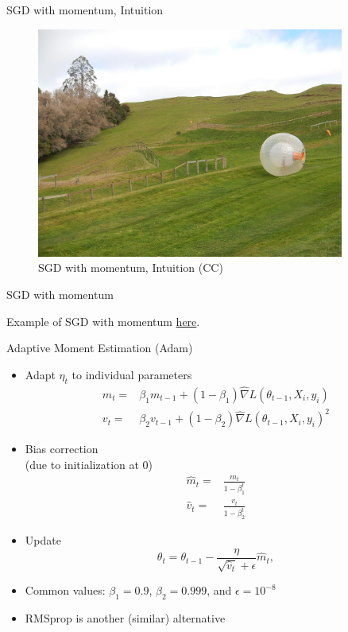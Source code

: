 \documentclass[10pt]{beamer}
\begin{document}
\begin{frame}{SGD with momentum, Intuition}

\begin{figure}[h]
\caption{SGD with momentum, Intuition (CC)}
\centering
\includegraphics[width=0.9\textwidth]{figs/zorb}
\end{figure}

\end{frame}

\begin{frame}{SGD with momentum}

Example of SGD with momentum \href{https://distill.pub/2017/momentum/}{here}.

\end{frame}


\begin{frame}{Adaptive Moment Estimation (Adam)}

\begin{itemize}
\item Adapt $\eta_t$ to individual parameters
\begin{align*}
m_t =& \beta_1 m_{t-1} + (1-\beta_1) \hat{\nabla} L(\theta_{t-1}, X_{i}, y_{i}) \\
v_t =& \beta_2 v_{t-1} + (1-\beta_2) \hat{\nabla} L(\theta_{t-1}, X_{i}, y_{i})^2
\end{align*}
\item Bias correction \\(due to initialization at 0)
\begin{align*}
\hat{m}_t =& \frac {m_{t}}{1-\beta_1^{t}}\\
\hat{v}_t =& \frac {v_{t}}{1-\beta_2^{t}}
\end{align*}
\item Update
\[
\theta_t = \theta_{t-1} - \frac{\eta}{\sqrt{\hat{v}_t} + \epsilon} \hat{m}_t,
\]
\item Common values: $\beta_1=0.9$, $\beta_2=0.999$, and $\epsilon=10^{-8}$\pause
\item RMSprop is another (similar) alternative
\end{itemize}

\end{frame}
\end{document}
